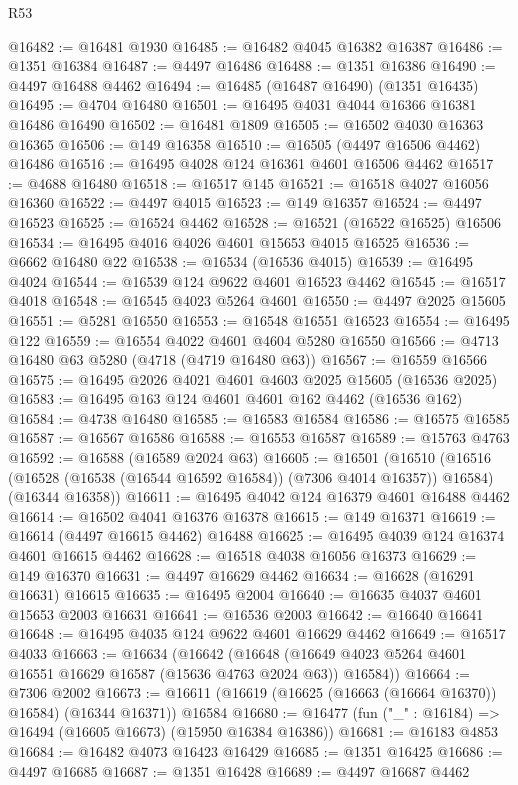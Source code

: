 \begin{lexlean}{R53}
\begin{coremodule}
@16482 := @16481 @1930
@16485 := @16482 @4045 @16382 @16387
@16486 := @1351 @16384
@16487 := @4497 @16486
@16488 := @1351 @16386
@16490 := @4497 @16488 @4462
@16494 := @16485 (@16487 @16490) (@1351 @16435)
@16495 := @4704 @16480
@16501 := @16495 @4031 @4044 @16366 @16381 @16486 @16490
@16502 := @16481 @1809
@16505 := @16502 @4030 @16363 @16365
@16506 := @149 @16358
@16510 := @16505 (@4497 @16506 @4462) @16486
@16516 := @16495 @4028 @124 @16361 @4601 @16506 @4462
@16517 := @4688 @16480
@16518 := @16517 @145
@16521 := @16518 @4027 @16056 @16360
@16522 := @4497 @4015
@16523 := @149 @16357
@16524 := @4497 @16523
@16525 := @16524 @4462
@16528 := @16521 (@16522 @16525) @16506
@16534 := @16495 @4016 @4026 @4601 @15653 @4015 @16525
@16536 := @6662 @16480 @22
@16538 := @16534 (@16536 @4015)
@16539 := @16495 @4024
@16544 := @16539 @124 @9622 @4601 @16523 @4462
@16545 := @16517 @4018
@16548 := @16545 @4023 @5264 @4601
@16550 := @4497 @2025 @15605
@16551 := @5281 @16550
@16553 := @16548 @16551 @16523
@16554 := @16495 @122
@16559 := @16554 @4022 @4601 @4604 @5280 @16550
@16566 := @4713 @16480 @63 @5280 (@4718 (@4719 @16480 @63))
@16567 := @16559 @16566
@16575 := @16495 @2026 @4021 @4601 @4603 @2025 @15605 (@16536 @2025)
@16583 := @16495 @163 @124 @4601 @4601 @162 @4462 (@16536 @162)
@16584 := @4738 @16480
@16585 := @16583 @16584
@16586 := @16575 @16585
@16587 := @16567 @16586
@16588 := @16553 @16587
@16589 := @15763 @4763
@16592 := @16588 (@16589 @2024 @63)
@16605 := @16501
    (@16510
      (@16516 (@16528 (@16538 (@16544 @16592 @16584)) (@7306 @4014 @16357)) @16584)
      (@16344 @16358))
@16611 := @16495 @4042 @124 @16379 @4601 @16488 @4462
@16614 := @16502 @4041 @16376 @16378
@16615 := @149 @16371
@16619 := @16614 (@4497 @16615 @4462) @16488
@16625 := @16495 @4039 @124 @16374 @4601 @16615 @4462
@16628 := @16518 @4038 @16056 @16373
@16629 := @149 @16370
@16631 := @4497 @16629 @4462
@16634 := @16628 (@16291 @16631) @16615
@16635 := @16495 @2004
@16640 := @16635 @4037 @4601 @15653 @2003 @16631
@16641 := @16536 @2003
@16642 := @16640 @16641
@16648 := @16495 @4035 @124 @9622 @4601 @16629 @4462
@16649 := @16517 @4033
@16663 := @16634
    (@16642
      (@16648 (@16649 @4023 @5264 @4601 @16551 @16629 @16587 (@15636 @4763 @2024 @63)) @16584))
@16664 := @7306 @2002
@16673 := @16611 (@16619 (@16625 (@16663 (@16664 @16370)) @16584) (@16344 @16371)) @16584
@16680 := @16477 (fun ("_" : @16184) => @16494 (@16605 @16673) (@15950 @16384 @16386))
@16681 := @16183 @4853
@16684 := @16482 @4073 @16423 @16429
@16685 := @1351 @16425
@16686 := @4497 @16685
@16687 := @1351 @16428
@16689 := @4497 @16687 @4462

\end{coremodule}
\end{lexlean}
